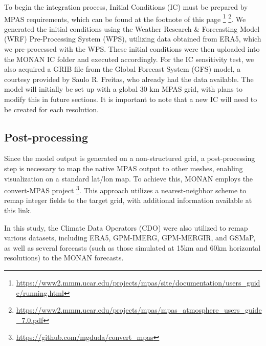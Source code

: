 To begin the integration process, Initial Conditions (IC) must be prepared by MPAS requirements, which can be found at the footnote of this page \footnote{\url{https://www2.mmm.ucar.edu/projects/mpas/site/documentation/users_guide/running.html}} \footnote{\url{https://www2.mmm.ucar.edu/projects/mpas/mpas_atmosphere_users_guide_7.0.pdf}}. We generated the initial conditions using the Weather Research \& Forecasting Model (WRF) Pre-Processing System (WPS), utilizing data obtained from ERA5, which we pre-processed with the WPS. These initial conditions were then uploaded into the MONAN IC folder and executed accordingly. For the IC sensitivity test, we also acquired a GRIB file from the Global Forecast System (GFS) model, a courtesy provided by Saulo R. Freitas, who already had the data available. The model will initially be set up with a global 30 km MPAS grid, with plans to modify this in future sections. It is important to note that a new IC will need to be created for each resolution.

\subsection{Post-processing}

Since the model output is generated on a non-structured grid, a post-processing step is necessary to map the native MPAS output to other meshes, enabling visualization on a standard lat/lon map. To achieve this, MONAN employs the convert-MPAS project \footnote{\url{https://github.com/mgduda/convert_mpas}}. This approach utilizes a nearest-neighbor scheme to remap integer fields to the target grid, with additional information available at this link.

In this study, the Climate Data Operators (CDO) were also utilized to remap various datasets, including ERA5, GPM-IMERG, GPM-MERGIR, and GSMaP, as well as several forecasts (such as those simulated at 15km and 60km horizontal resolutions) to the MONAN forecasts.

